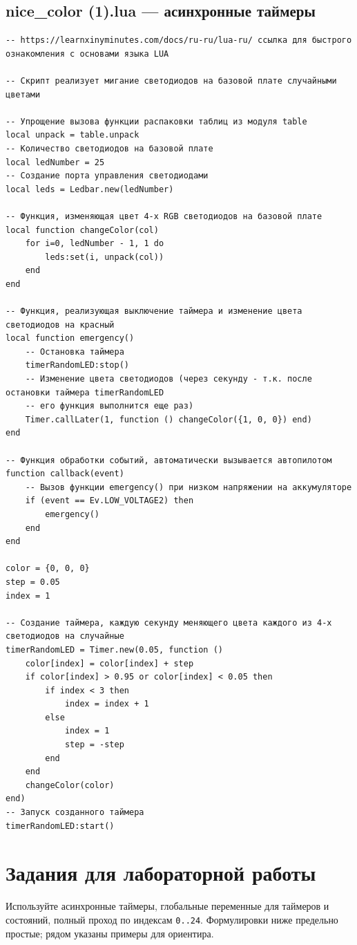\documentclass[a4paper,12pt]{article}
\begin{document}
\subsection{nice\_color (1).lua — асинхронные таймеры}
\begin{lstlisting}[style=lua,caption={nice_color (1).lua}]
-- https://learnxinyminutes.com/docs/ru-ru/lua-ru/ ссылка для быстрого ознакомления с основами языка LUA

-- Скрипт реализует мигание светодиодов на базовой плате случайными цветами

-- Упрощение вызова функции распаковки таблиц из модуля table
local unpack = table.unpack
-- Количество светодиодов на базовой плате
local ledNumber = 25
-- Создание порта управления светодиодами
local leds = Ledbar.new(ledNumber)

-- Функция, изменяющая цвет 4-х RGB светодиодов на базовой плате
local function changeColor(col)
    for i=0, ledNumber - 1, 1 do
        leds:set(i, unpack(col))
    end
end

-- Функция, реализующая выключение таймера и изменение цвета светодиодов на красный
local function emergency()
    -- Остановка таймера
    timerRandomLED:stop()
    -- Изменение цвета светодиодов (через секунду - т.к. после остановки таймера timerRandomLED
    -- его функция выполнится еще раз)
    Timer.callLater(1, function () changeColor({1, 0, 0}) end)
end

-- Функция обработки событий, автоматически вызывается автопилотом
function callback(event)
    -- Вызов функции emergency() при низком напряжении на аккумуляторе
    if (event == Ev.LOW_VOLTAGE2) then
        emergency()
    end
end

color = {0, 0, 0} 
step = 0.05 
index = 1

-- Создание таймера, каждую секунду меняющего цвета каждого из 4-х светодиодов на случайные
timerRandomLED = Timer.new(0.05, function ()
    color[index] = color[index] + step
    if color[index] > 0.95 or color[index] < 0.05 then
        if index < 3 then
            index = index + 1
        else
            index = 1
            step = -step
        end
    end
    changeColor(color)
end)
-- Запуск созданного таймера
timerRandomLED:start()
\end{lstlisting}

\section{Задания для лабораторной работы}
Используйте асинхронные таймеры, глобальные переменные для таймеров и состояний, полный проход по индексам \verb|0..24|. Формулировки ниже предельно простые; рядом указаны примеры для ориентира.
\end{document}
